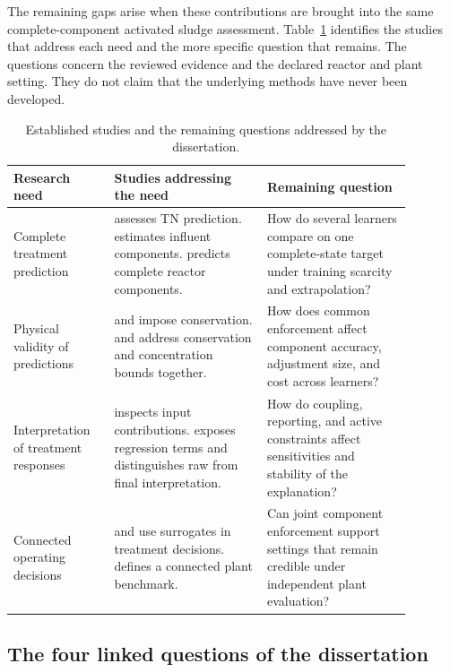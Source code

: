 The remaining gaps arise when these contributions are brought into the same complete-component activated sludge assessment. Table~\ref{tab:rrl_evidence_gap_matrix} identifies the studies that address each need and the more specific question that remains. The questions concern the reviewed evidence and the declared reactor and plant setting. They do not claim that the underlying methods have never been developed.

\begin{table}[htbp]
\centering\footnotesize
\caption{Established studies and the remaining questions addressed by the dissertation.}
\label{tab:rrl_evidence_gap_matrix}
\begin{tabular}{>{\raggedright\arraybackslash}p{0.22\linewidth}>{\raggedright\arraybackslash}p{0.34\linewidth}>{\raggedright\arraybackslash}p{0.32\linewidth}}
\toprule Research need & Studies addressing the need & Remaining question\\\midrule
Complete treatment prediction & \citet{Wang2025} assesses TN prediction. \citet{Wang2024} estimates influent components. \citet{Selerio2026} predicts complete reactor components. & How do several learners compare on one complete-state target under training scarcity and extrapolation?\\
Physical validity of predictions & \citet{Beucler2021} and \citet{SturmWexler2022} impose conservation. \citet{KircherVotsmeier2025} and \citet{Selerio2026} address conservation and concentration bounds together. & How does common enforcement affect component accuracy, adjustment size, and cost across learners?\\
Interpretation of treatment responses & \citet{Wang2025} inspects input contributions. \citet{Selerio2026} exposes regression terms and distinguishes raw from final interpretation. & How do coupling, reporting, and active constraints affect sensitivities and stability of the explanation?\\
Connected operating decisions & \citet{Fang2011} and \citet{Durkin2024} use surrogates in treatment decisions. \citet{Alex2008} defines a connected plant benchmark. & Can joint component enforcement support settings that remain credible under independent plant evaluation?\\
\bottomrule
\end{tabular}
\end{table}

\subsection{The four linked questions of the dissertation}


